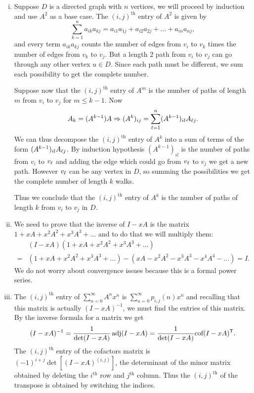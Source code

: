 \documentclass[12pt]{memoir}
\begin{document}
\begin{ptcbr}
    \begin{enumerate}[i)]
        \itemsep=-0.4em 
        \item Suppose $D$ is a directed graph with $n$ vertices, we will proceed by induction and use $A^2$ as a base case. The $(i,j)^{\text{th}}$ entry of $A^2$ is given by 
        $$\sum_{k=1}^na_{ik}a_{kj}=a_{i1}a_{1j}+a_{i2}a_{2j}+\dots+a_{in}a_{nj},$$
        and every term $a_{ik}a_{kj}$ counts the number of edges from $v_i$ to $v_k$ times the number of edges from $v_k$ to $v_j$. But a length 2 path from $v_i$ to $v_j$ can go through any other vertex $u\in D$. Since each path must be different, we sum each possibility to get the complete number.\par 
        Suppose now that the $(i,j)^{\text{th}}$ entry of $A^m$ is the number of paths of length $m$ from $v_i$ to $v_j$ for $m\leq k-1$. Now 
        $$A_k=(A^{k-1})A\Rightarrow (A^k)_{ij}=\sum_{\ell=1}^n(A^{k-1})_{il}A_{\ell j}.$$
        We can thus decompose the $(i,j)^{\text{th}}$ entry of $A^k$ into a sum of terms of the form $(A^{k-1})_{il}A_{\ell j}$. By induction hypothesis $(A^{k-1})_{il}$ is the number of paths from $v_i$ to $v_\ell$ and adding the edge which could go from $v_\ell$ to $v_j$ we get a new path. However $v_\ell$ can be any vertex in $D$, so summing the possibilities we get the complete number of length $k$ walks.\par 
        Thus we conclude that the $(i,j)^{\text{th}}$ entry of $A^k$ is the number of paths of length $k$ from $v_i$ to $v_j$ in $D$.
        \item We need to prove that the inverse of $I-xA$ is the matrix $1+xA+x^2A^2+x^3A^3+\dots$ and to do that we will multiply them:
        \begin{align*}
            &(I-xA)(1+xA+x^2A^2+x^3A^3+\dots)\\
            =&(1+xA+x^2A^2+x^3A^3+\dots)-(xA-x^2A^2-x^3A^3-x^4A^4-\dots)=I.
        \end{align*}
        We do not worry about convergence issues because this is a formal power series.
        \item The $(i,j)^{\text{th}}$ entry of $\sum_{n=0}^\infty A^nx^n$ is $\sum_{n=0}^\infty p_{i,j}(n)x^n$ and recalling that this matrix is actually $(I-xA)^{-1}$, we must find the entries of this matrix. By the inverse formula for a matrix we get 
        $$(I-xA)^{-1}=\frac{1}{\det(I-xA)}\operatorname{adj}(I-xA)=\frac{1}{\det(I-xA)}\text{cof}(I-xA)^{\mathsf{T}}.$$
        The $(i,j)^{\text{th}}$ entry of the cofactors matrix is $(-1)^{i+j}\det[(I-xA)^{(i,j)}]$, the determinant of the minor matrix obtained by deleting the $i^{\text{th}}$ row and $j^{\text{th}}$ column. Thus the $(i,j)^{\text{th}}$ of the transpose is obtained by switching the indices.\par 

\end{enumerate}
\end{ptcbr}
\end{document}
